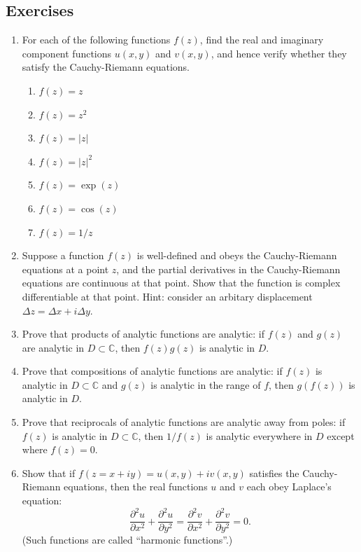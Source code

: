 \documentclass[10pt,a4paper]{article}
\begin{document}
\subsection{Exercises}
\label{exercises}

\begin{enumerate}
\item 
For each of the following functions $f(z)$, find the real and
imaginary component functions $u(x,y)$ and $v(x,y)$, and hence
verify whether they satisfy the Cauchy-Riemann equations.
\begin{enumerate}
\item $f(z) = z$

\item $f(z) = z^2$

\item $f(z) = |z|$

\item $f(z) = |z|^2$

\item $f(z) = \exp(z)$

\item $f(z) = \cos(z)$

\item $f(z) = 1/z$
\end{enumerate}

\item
  Suppose a function $f(z)$ is well-defined and obeys the Cauchy-Riemann
equations at a point $z$, and the partial derivatives in the
Cauchy-Riemann equations are continuous at that point. Show that the
function is complex differentiable at that point. Hint: consider an
arbitary displacement $\Delta z = \Delta x + i \Delta y$.

\item
  Prove that products of analytic functions are analytic: if $f(z)$ and
$g(z)$ are analytic in $D \subset \mathbb{C}$, then $f(z) g(z)$ is
analytic in $D$.

\item
  Prove that compositions of analytic functions are analytic: if $f(z)$
is analytic in $D \subset \mathbb{C}$ and $g(z)$ is analytic in the
range of $f$, then $g(f(z))$ is analytic in $D$.

\item
  Prove that reciprocals of analytic functions are analytic away from
poles: if $f(z)$ is analytic in $D \subset \mathbb{C}$, then
$1/f(z)$ is analytic everywhere in $D$ except where $f(z) = 0$.

\item
  Show that if $f(z = x + iy) = u(x,y) + i v(x,y)$ satisfies the
Cauchy-Riemann equations, then the real functions $u$ and $v$ each
obey Laplace's
equation:
\begin{equation}
  \frac{\partial^2 u}{\partial x^2} + \frac{\partial^2u}{\partial y^2} = \frac{\partial^2 v}{\partial x^2} + \frac{\partial^2 v}{\partial y^2} = 0.
\end{equation}
(Such functions are called ``harmonic functions''.)


\end{enumerate}
\end{document}
